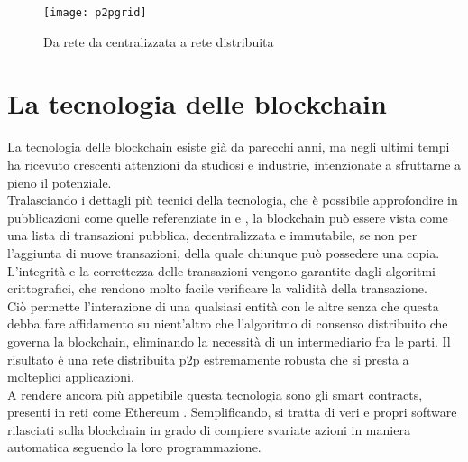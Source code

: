 \begin{figure}[h]
    \texttt{[image: p2pgrid]}
    \centering
    \caption{Da rete da centralizzata a rete distribuita \cite{img:p2pgrid}}
    \label{lab:p2pgrid}
\end{figure}


\section{La tecnologia delle blockchain}
La tecnologia delle blockchain esiste già da parecchi anni, ma negli ultimi tempi ha ricevuto crescenti attenzioni da studiosi e industrie, intenzionate a sfruttarne a pieno il potenziale. \\
Tralasciando i dettagli più tecnici della tecnologia, che è possibile approfondire in pubblicazioni come quelle referenziate in \cite{art:blockchain} e \cite{art:blockchain-for-industry}, 
la blockchain può essere vista come una lista di transazioni pubblica, decentralizzata e immutabile, se non per l'aggiunta di nuove transazioni, della quale chiunque può possedere una copia. \\
L'integrità e la correttezza delle transazioni vengono garantite dagli algoritmi crittografici, che rendono molto facile verificare la validità della transazione. \\
Ciò permette l'interazione di una qualsiasi entità con le altre senza che questa debba fare affidamento su nient'altro che l'algoritmo di consenso distribuito che governa la blockchain, eliminando la necessità di un intermediario fra le parti. 
Il risultato è una rete distribuita \gls{p2p} estremamente robusta che si presta a molteplici applicazioni. \\
A rendere ancora più appetibile questa tecnologia sono gli smart contracts, presenti in reti come Ethereum \cite{wiki:eth-smart-contracts}. Semplificando, si tratta di veri e propri software rilasciati sulla blockchain 
in grado di compiere svariate azioni in maniera automatica seguendo la loro programmazione.